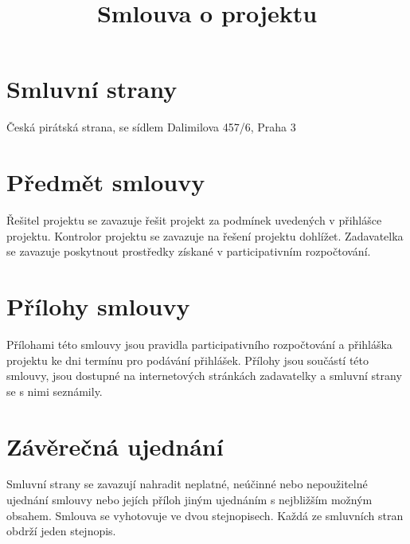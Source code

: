 \documentclass[11pt,a4paper,czech]{article}
\begin{document}
\title{Smlouva o projektu}

\begin{Form}

\section{Smluvní strany}

{
   Česká pirátská strana, se sídlem Dalimilova 457/6, Praha 3
   
}

{
     \hfill{} 
   
}

{
     \hfill{} 
   
}

\section{Předmět smlouvy}

Řešitel projektu se zavazuje řešit projekt za podmínek uvedených v přihlášce projektu. Kontrolor projektu se zavazuje na řešení projektu dohlížet. Zadavatelka se zavazuje poskytnout prostředky získané v participativním rozpočtování.

 \hfill{}  


\section{Přílohy smlouvy}

Přílohami této smlouvy jsou pravidla participativního rozpočtování a přihláška projektu ke dni termínu pro podávání přihlášek. Přílohy jsou součástí této smlouvy, jsou dostupné na internetových stránkách zadavatelky a smluvní strany se s nimi seznámily.

\section{Závěrečná ujednání}
Smluvní strany se zavazují nahradit neplatné, neúčinné nebo nepoužitelné ujednání smlouvy nebo jejích příloh jiným ujednáním s nejbližším možným obsahem. Smlouva se vyhotovuje ve dvou stejnopisech. Každá ze smluvních stran obdrží jeden stejnopis.

 

\end{Form}

\hypersetup{pdfborder=0 0 0}
\end{document}
